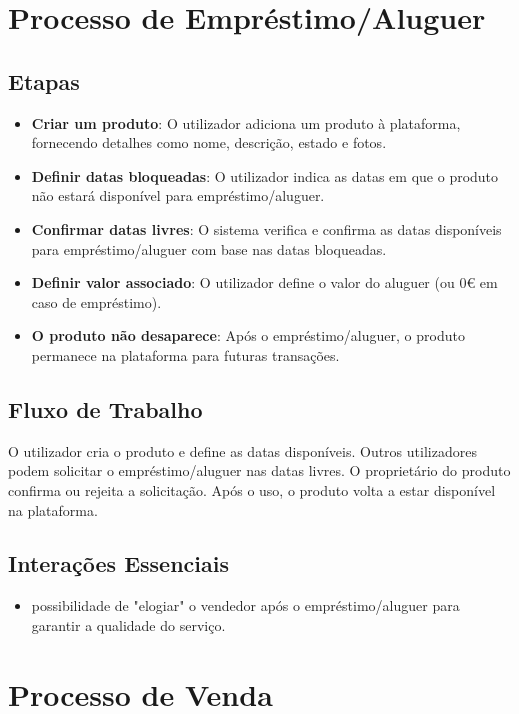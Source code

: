 \documentclass[a4paper, 12pt]{article} %
\begin{document}
\section{Processo de Empréstimo/Aluguer}

\subsection{Etapas}
\begin{itemize}
    \item \textbf{Criar um produto}: O utilizador adiciona um produto à plataforma, fornecendo detalhes como nome, descrição, estado e fotos.
    \item \textbf{Definir datas bloqueadas}: O utilizador indica as datas em que o produto não estará disponível para empréstimo/aluguer.
    \item \textbf{Confirmar datas livres}: O sistema verifica e confirma as datas disponíveis para empréstimo/aluguer com base nas datas bloqueadas.
    \item \textbf{Definir valor associado}: O utilizador define o valor do aluguer (ou 0€ em caso de empréstimo).
    \item \textbf{O produto não desaparece}: Após o empréstimo/aluguer, o produto permanece na plataforma para futuras transações.
\end{itemize}

\subsection{Fluxo de Trabalho}
O utilizador cria o produto e define as datas disponíveis. Outros utilizadores podem solicitar o empréstimo/aluguer nas datas livres. O proprietário do produto confirma ou rejeita a solicitação. Após o uso, o produto volta a estar disponível na plataforma.

\subsection{Interações Essenciais}
\begin{itemize}
    \item possibilidade de "elogiar" o vendedor após o empréstimo/aluguer para garantir a qualidade do serviço.
\end{itemize}

\section{Processo de Venda}
\end{document}
